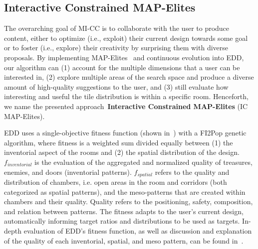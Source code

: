 \subsection{Interactive Constrained MAP-Elites} \label{section:3}

The overarching goal of MI-CC is to collaborate with the user to produce content, either to optimize (i.e., exploit) their current design towards some goal or to foster (i.e., explore) their creativity by surprising them with diverse proposals. By implementing MAP-Elites~ and continuous evolution into EDD, our algorithm can (1) account for the multiple dimensions that a user can be interested in, (2) explore multiple areas of the search space and produce a diverse amount of high-quality suggestions to the user, and (3) still evaluate how interesting and useful the tile distribution is within a specific room. Henceforth, we name the presented approach~\textbf{Interactive Constrained MAP-Elites} (IC MAP-Elites).

EDD uses a single-objective fitness function (shown in~) with a FI2Pop genetic algorithm, where fitness is a weighted sum divided equally between (1) the inventorial aspect of the rooms and (2) the spatial distribution of the design. $f_{inventorial}$ is the evaluation of the aggregated and normalized quality of treasures, enemies, and doors (inventorial patterns). $f_{spatial}$ refers to the quality and distribution of chambers, i.e. open areas in the room and corridors (both categorized as spatial patterns), and the meso-patterns that are created within chambers and their quality. Quality refers to the positioning, safety, composition, and relation between patterns. The fitness adapts to the user's current design, automatically informing target ratios and distributions to be used as targets. In-depth evaluation of EDD's fitness function, as well as discussion and explanation of the quality of each inventorial, spatial, and meso pattern, can be found in~.


